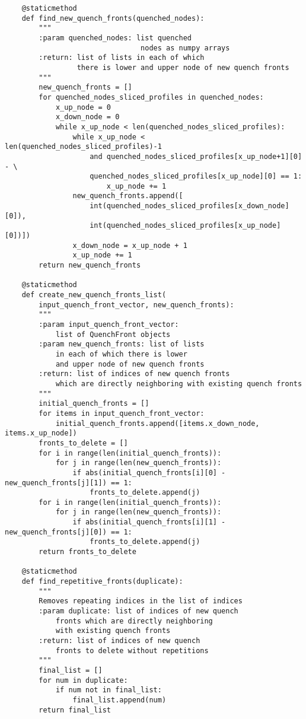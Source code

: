 \begin{verbatim}
    @staticmethod
    def find_new_quench_fronts(quenched_nodes):
        """
        :param quenched_nodes: list quenched 
                                nodes as numpy arrays
        :return: list of lists in each of which 
                 there is lower and upper node of new quench fronts
        """
        new_quench_fronts = []
        for quenched_nodes_sliced_profiles in quenched_nodes:
            x_up_node = 0
            x_down_node = 0
            while x_up_node < len(quenched_nodes_sliced_profiles):
                while x_up_node < len(quenched_nodes_sliced_profiles)-1 
                    and quenched_nodes_sliced_profiles[x_up_node+1][0] - \
                    quenched_nodes_sliced_profiles[x_up_node][0] == 1:
                        x_up_node += 1
                new_quench_fronts.append([
                    int(quenched_nodes_sliced_profiles[x_down_node][0]),
                    int(quenched_nodes_sliced_profiles[x_up_node][0])])
                x_down_node = x_up_node + 1
                x_up_node += 1
        return new_quench_fronts

    @staticmethod
    def create_new_quench_fronts_list(
        input_quench_front_vector, new_quench_fronts):
        """
        :param input_quench_front_vector: 
            list of QuenchFront objects
        :param new_quench_fronts: list of lists 
            in each of which there is lower 
            and upper node of new quench fronts
        :return: list of indices of new quench fronts 
            which are directly neighboring with existing quench fronts
        """
        initial_quench_fronts = []
        for items in input_quench_front_vector:
            initial_quench_fronts.append([items.x_down_node, items.x_up_node])
        fronts_to_delete = []
        for i in range(len(initial_quench_fronts)):
            for j in range(len(new_quench_fronts)):
                if abs(initial_quench_fronts[i][0] - new_quench_fronts[j][1]) == 1:
                    fronts_to_delete.append(j)
        for i in range(len(initial_quench_fronts)):
            for j in range(len(new_quench_fronts)):
                if abs(initial_quench_fronts[i][1] - new_quench_fronts[j][0]) == 1:
                    fronts_to_delete.append(j)
        return fronts_to_delete

    @staticmethod
    def find_repetitive_fronts(duplicate):
        """
        Removes repeating indices in the list of indices
        :param duplicate: list of indices of new quench 
            fronts which are directly neighboring 
            with existing quench fronts
        :return: list of indices of new quench 
            fronts to delete without repetitions
        """
        final_list = []
        for num in duplicate:
            if num not in final_list:
                final_list.append(num)
        return final_list


\end{verbatim}
